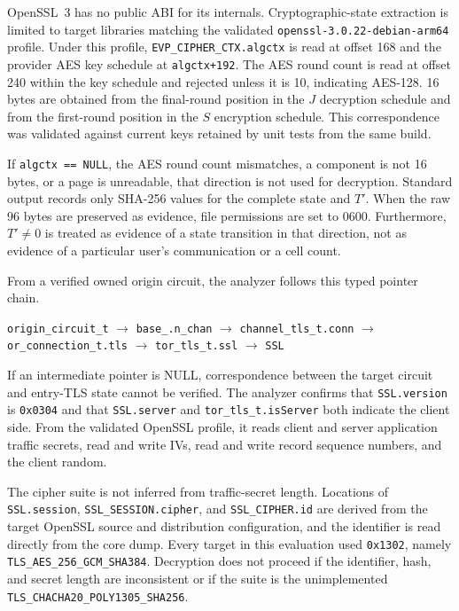 \documentclass[10pt,a4paper]{article}
\newcommand{\code}[1]{\nolinkurl{#1}}
\begin{document}
OpenSSL~3 has no public ABI for its internals. Cryptographic-state extraction is limited to target libraries matching the validated \code{openssl-3.0.22-debian-arm64} profile. Under this profile, \code{EVP_CIPHER_CTX.algctx} is read at offset 168 and the provider AES key schedule at \code{algctx+192}. The AES round count is read at offset 240 within the key schedule and rejected unless it is 10, indicating AES-128. 16 bytes are obtained from the final-round position in the $J$ decryption schedule and from the first-round position in the $S$ encryption schedule. This correspondence was validated against current keys retained by unit tests from the same build.

If \code{algctx == NULL}, the AES round count mismatches, a component is not 16 bytes, or a page is unreadable, that direction is not used for decryption. Standard output records only SHA-256 values for the complete state and $T'$. When the raw 96 bytes are preserved as evidence, file permissions are set to 0600.
Furthermore, $T'\neq 0$ is treated as evidence of a state transition in that direction, not as evidence of a particular user's communication or a cell count.


From a verified owned origin circuit, the analyzer follows this typed pointer chain.

\begin{center}
\small
\code{origin_circuit_t} $\rightarrow$ \code{base_.n_chan} $\rightarrow$
\code{channel_tls_t.conn} $\rightarrow$ \code{or_connection_t.tls}
$\rightarrow$ \code{tor_tls_t.ssl} $\rightarrow$ \code{SSL}
\end{center}

If an intermediate pointer is NULL, correspondence between the target circuit and entry-TLS state cannot be verified. The analyzer confirms that \code{SSL.version} is \code{0x0304} and that \code{SSL.server} and \code{tor_tls_t.isServer} both indicate the client side. From the validated OpenSSL profile, it reads client and server application traffic secrets, read and write IVs, read and write record sequence numbers, and the client random.

The cipher suite is not inferred from traffic-secret length. Locations of \code{SSL.session}, \code{SSL_SESSION.cipher}, and \code{SSL_CIPHER.id} are derived from the target OpenSSL source and distribution configuration, and the identifier is read directly from the core dump. Every target in this evaluation used \code{0x1302}, namely \code{TLS_AES_256_GCM_SHA384}. Decryption does not proceed if the identifier, hash, and secret length are inconsistent or if the suite is the unimplemented \code{TLS_CHACHA20_POLY1305_SHA256}.
\end{document}
